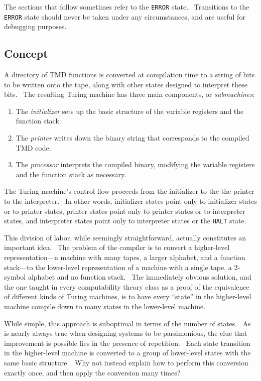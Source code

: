 \documentclass[11pt]{article}
\begin{document}
The sections that follow sometimes refer to the \texttt{ERROR} state. \ Transitions to the \texttt{ERROR} state should never be taken under any circumstances, and are useful for debugging purposes.

\subsection{Concept} \label{sec:ontape}

A directory of TMD functions is converted at compilation time to a string of bits to be written onto the tape, along with other states designed to interpret these bits. \ The resulting Turing machine has three main components, or \emph{submachines}:

\begin{enumerate}
\item The \emph{initializer} sets up the basic structure of the variable registers and the function stack.
\item The \emph{printer} writes down the binary string that corresponds to the compiled TMD code.
\item The \emph{processor} interprets the compiled binary, modifying the variable registers and the function stack as necessary.
\end{enumerate}

The Turing machine's control flow proceeds from the initializer to the the printer to the interpreter. \ In other words, initializer states point only to initializer states or to printer states, printer states point only to printer states or to interpreter states, and interpreter states point only to interpreter states or the \texttt{HALT} state.

This division of labor, while seemingly straightforward, actually constitutes an important idea. \ The problem of the compiler is to convert a higher-level representation---a machine with many tapes, a larger alphabet, and a function stack---to the lower-level representation of a machine with a single tape, a $2$-symbol alphabet and no function stack. \ The immediately obvious solution, and the one taught in every computability theory class as a proof of the equivalence of different kinds of Turing machines, is to have every ``state'' in the higher-level machine compile down to many states in the lower-level machine. %

While simple, this approach is suboptimal in terms of the number of states. \ As is nearly always true when designing systems to be parsimonious, the clue that improvement is possible lies in the presence of repetition. \ Each state transition in the higher-level machine is converted to a group of lower-level states with the same basic structure. \ Why not instead explain how to perform this conversion exactly once, and then apply the conversion many times?
\end{document}
